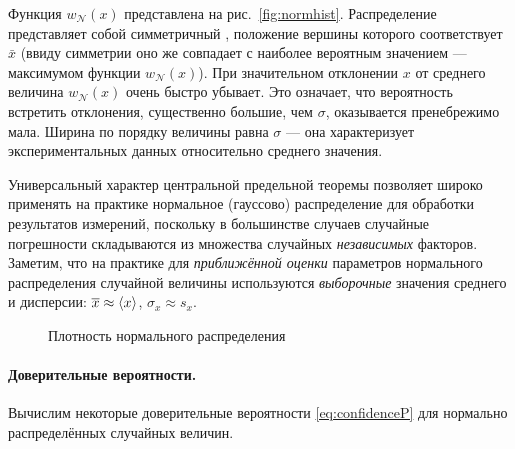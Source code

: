 Функция $w_{\mathcal{N}}(x)$ представлена на рис.~\ref{fig:normhist}.
Распределение представляет собой симметричный
, положение вершины которого
соответствует $\bar{x}$ (ввиду симметрии оно же
совпадает с наиболее вероятным значением --- максимумом
функции $w_{\mathcal{N}}(x)$).
При значительном отклонении $x$ от среднего величина
$w_{\mathcal{N}}\!\left(x\right)$
очень быстро убывает. Это означает, что вероятность встретить отклонения,
существенно большие, чем $\sigma$, оказывается пренебрежимо
мала. Ширина  по порядку величины
равна $\sigma$ --- она характеризует 
экспериментальных данных относительно среднего значения.


Универсальный характер центральной предельной теоремы позволяет широко
применять на практике нормальное (гауссово) распределение для обработки
результатов измерений, поскольку в большинстве случаев случайные погрешности складываются из
множества случайных \emph{независимых} факторов. Заметим, что на практике
для \emph{приближённой оценки} параметров нормального распределения
случайной величины используются \emph{выборочные} значения среднего
и дисперсии: $\overline{x}\approx\left<x\right>$, $\sigma_{x}\approx s_{x}$.

\begin{figure}[ht]
    \centering
    
    \caption{Плотность нормального распределения}
\end{figure}

\paragraph{Доверительные вероятности.}
Вычислим некоторые доверительные вероятности \eqref{eq:confidenceP} для нормально
распределённых случайных величин.

